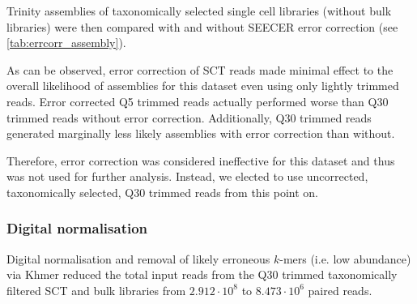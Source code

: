 Trinity assemblies of taxonomically selected single cell libraries 
(without bulk libraries) were then compared with and without SEECER 
error correction (see \cref{tab:errcorr_assembly}).
\begin{table}[h!]

    \caption[Effect of error correction on assembly]{Naive Trinity assembly of Q5 and Q30 trimmed taxonomically selected single cell libraries
        with and without SEECER error correction. While assembly likelihood increases after
    error correction for Q5 trimmed reads it is still lower than Q30 uncorrected.  For Q30
trimmed reads error correction marginally decreases assembly likelihood.}
    \label{tab:errcorr_assembly}
\end{table}

As can be observed, error correction of SCT reads made minimal effect to the overall likelihood
of assemblies for this dataset even using only lightly trimmed reads.  Error corrected Q5
trimmed reads actually performed worse than Q30 trimmed reads without error correction. 
Additionally, Q30 trimmed reads generated marginally less likely assemblies with 
error correction than without. 

Therefore, error correction
was considered ineffective for this dataset and thus was not 
used for further analysis.  Instead, we elected to use uncorrected, taxonomically selected,
Q30 trimmed reads from this point on. 

\subsubsection{Digital normalisation} 
Digital normalisation and removal of likely erroneous \(k\)-mers (i.e. low abundance) 
via Khmer reduced the total input reads from the Q30 trimmed taxonomically
filtered SCT and bulk libraries from 
\(2.912\cdot 10^{8}\) to \(8.473\cdot 10^6\) paired reads.

